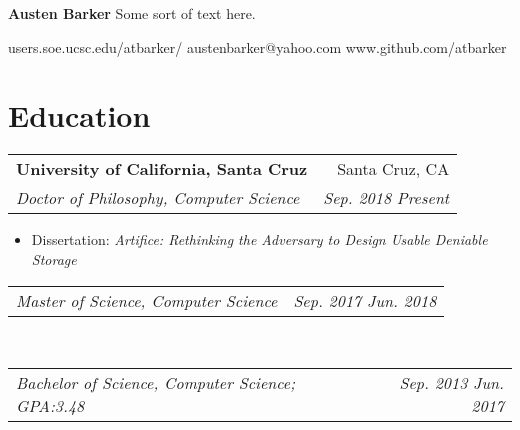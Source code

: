 \documentclass[letterpaper,10pt,oneside]{memoir}
\makeatletter
\newcommand{\resumeSubheading}[4]{
  \vspace{1pt}%
    \begin{tabular*}{0.99\textwidth}[t]{l@{\extracolsep{\fill}}r}
      \textbf{#1} & #2 \\
      \textit{\small #3} & \textit{\small #4} \\
    \end{tabular*}
}
\newcommand{\resumeSubheadingContinue}[2]{
  \vspace{-1pt}
    \begin{tabular*}{0.99\textwidth}[t]{l@{\extracolsep{\fill}}r}
      \textit{\small #1} & \textit{\small #2} \\
    \end{tabular*}
}
\newcommand{\resumeSubHeadingListStart}{\vspace{1pt}\begin{itemize}[noitemsep,nolistsep,leftmargin=*,label={}]}
\newcommand{\resumeSubHeadingListEnd}{\end{itemize}}
\makeatother
\begin{document}

\begin{minipage}[t]{0.75\textwidth}
\raggedright
    {\fontsize{30pt}{34pt}\selectfont
        \rmfamily\textbf{Austen Barker}}
    \vfill
    Some sort of text here.
\end{minipage}
\begin{minipage}[t]{0.25\textwidth}
\raggedleft
    users.soe.ucsc.edu/atbarker/
    \vfill
    austenbarker@yahoo.com
    \vfill
    www.github.com/atbarker
\end{minipage}



\vskip6pt




\section{Education}
    \resumeSubheading
     {University of California, Santa Cruz}{Santa Cruz, CA}
     {Doctor of Philosophy, Computer Science}{Sep. 2018 \textemdash{} Present}
     \vspace{-5pt}
      \resumeSubHeadingListStart
	\item \small{Dissertation: \emph{Artifice: Rethinking the Adversary to Design Usable Deniable Storage}}
      \resumeSubHeadingListEnd
     \vspace{-5pt}
    \resumeSubheadingContinue
      {Master of Science, Computer Science}{Sep. 2017 \textemdash{} Jun. 2018}\\
    \resumeSubheadingContinue
      {Bachelor of Science, Computer Science; GPA:\@ 3.48}{Sep. 2013 \textemdash{} Jun. 2017}
\end{document}

